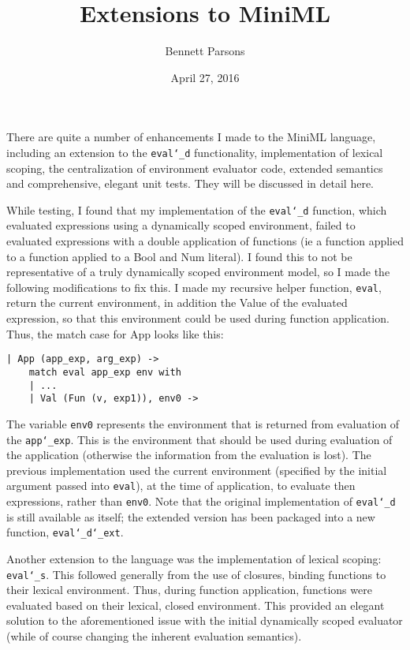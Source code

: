 \documentclass{article}
\title{Extensions to MiniML}
\author{Bennett Parsons}
\date{April 27, 2016}
\begin{document}
\maketitle

There are quite a number of enhancements I made to the MiniML language, including an extension to the \texttt{eval\char`_d} functionality, implementation of lexical scoping, the centralization of environment evaluator code, extended semantics and comprehensive, elegant unit tests. They will be discussed in detail here.

While testing, I found that my implementation of the \texttt{eval\char`_d} function, which evaluated expressions using a dynamically scoped environment, failed to evaluated expressions with a double application of functions (ie a function applied to a function applied to a Bool and Num literal). I found this to not be representative of a truly dynamically scoped environment model, so I made the following modifications to fix this. I made my recursive helper function, \texttt{eval}, return the current environment, in addition the Value of the evaluated expression, so that this environment could be used during function application. Thus, the match case for App looks like this:

\begin{lstlisting}
| App (app_exp, arg_exp) ->
    match eval app_exp env with
    | ...  
    | Val (Fun (v, exp1)), env0 -> 
\end{lstlisting}

The variable \texttt{env0} represents the environment that is returned from evaluation of the \texttt{app\char`_exp}. This is the environment that should be used during evaluation of the application (otherwise the information from the evaluation is lost).  The previous implementation used the current environment (specified by the initial argument passed into \texttt{eval}), at the time of application, to evaluate then expressions, rather than \texttt{env0}.  Note that the original implementation of \texttt{eval\char`_d} is still available as itself; the extended version has been packaged into a new function, \texttt{eval\char`_d\char`_ext}.

Another extension to the language was the implementation of lexical scoping: \texttt{eval\char`_s}. This followed generally from the use of closures, binding functions to their lexical environment. Thus, during function application, functions were evaluated based on their lexical, closed environment. This provided an elegant solution to the aforementioned issue with the initial dynamically scoped evaluator (while of course changing the inherent evaluation semantics).
\end{document}
